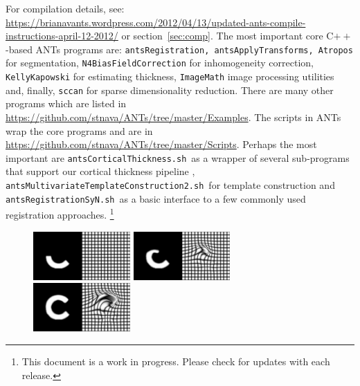 \documentclass{InsightArticle}
\begin{document}
For compilation details, see:
\href{https://brianavants.wordpress.com/2012/04/13/updated-ants-compile-instructions-april-12-2012/}{https://brianavants.wordpress.com/2012/04/13/updated-ants-compile-instructions-april-12-2012/}
or section~\ref{sec:comp}.
The most important core C${++}$-based ANTs programs are: 
\texttt{antsRegistration, antsApplyTransforms, Atropos} for
segmentation, \texttt{N4BiasFieldCorrection} for
inhomogeneity correction,  \texttt{KellyKapowski} for estimating
thickness, \texttt{ImageMath} image processing utilities
and, finally, \texttt{sccan} for sparse dimensionality reduction.  There
are many other programs which are listed in
\href{https://github.com/stnava/ANTs/tree/master/Examples}{https://github.com/stnava/ANTs/tree/master/Examples}.
The scripts in ANTs wrap the core programs and are in
\href{https://github.com/stnava/ANTs/tree/master/Scripts}{https://github.com/stnava/ANTs/tree/master/Scripts}.
Perhaps the most important are \texttt{antsCorticalThickness.sh}~as a
wrapper of several sub-programs that support our
cortical thickness pipeline \cite{TustisonACT}, \texttt{antsMultivariateTemplateConstruction2.sh}~for template construction
and \texttt{antsRegistrationSyN.sh}~as a basic interface to a few commonly used registration approaches.
\footnote{This document is a work in progress. Please check for updates with each release.}
\begin{figure}
\includegraphics[width=0.33\textwidth]{Figures/grid1100.pdf} 
\includegraphics[width=0.33\textwidth]{Figures/grid1110.pdf} 
\includegraphics[width=0.33\textwidth]{Figures/grid1119.pdf} 
\vspace{-0.1in}
\label{fig:chalf}
\end{figure}
\end{document}
